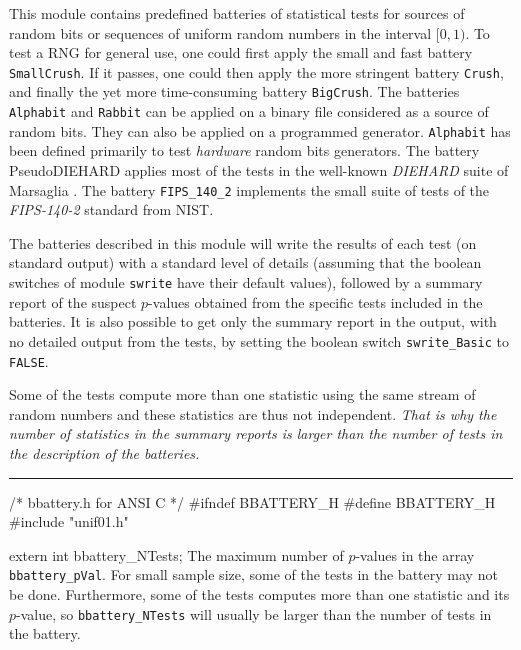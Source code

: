 
This module contains predefined batteries of statistical tests for
sources of random bits or sequences of uniform random numbers in 
the interval $[0, 1)$.
To test a RNG for general use, one could first apply the 
small and fast battery {\tt SmallCrush}.
If it passes, one could then apply the more stringent battery 
{\tt Crush}, and finally the yet more time-consuming 
battery {\tt BigCrush}.
The batteries {\tt Alphabit} and {\tt Rabbit} can be applied on a binary
file considered as a source of random bits. They can also be applied
on a programmed generator.  {\tt Alphabit} has been defined primarily to test
{\it hardware} random bits generators.
The battery {PseudoDIEHARD} applies most of the tests in 
the well-known {\it DIEHARD\/} suite of Marsaglia \cite{rMAR96b}.
The battery {\tt FIPS\_140\_2} implements the small suite of tests
of the {\it FIPS-140-2} standard from NIST.

The batteries described in this module  will write the results of each test
(on standard output) with a standard level of details (assuming that the
 boolean switches of module {\tt swrite} have their default values), 
followed by a summary  report of the suspect $p$-values obtained from the
 specific tests included in the batteries. 
It is also possible to get only the summary report in the output, 
with no detailed output from the tests, 
by setting the boolean switch {\tt swrite\_Basic} to {\tt FALSE}.

Some of the tests compute more than one statistic using the same stream of 
random numbers and these statistics are thus not independent.
\emph{That is why the number of statistics in the summary reports is larger than 
the number of tests in the description of the batteries.}

\bigskip
\hrule
\code\hide
/* bbattery.h for ANSI C */
#ifndef BBATTERY_H
#define BBATTERY_H
\endhide
#include "unif01.h"


extern int bbattery_NTests;   
\endcode
  \tab The maximum number of $p$-values in the array {\tt bbattery\_pVal}.
  For small sample size, some of the tests in the battery may not be done.
  Furthermore, some of the tests computes more than one statistic and
  its $p$-value, so {\tt bbattery\_NTests} will usually be larger than
  the number of tests in the battery.
  \endtab
\code


